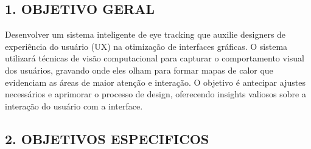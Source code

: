 \subsection*{1. OBJETIVO GERAL}
Desenvolver um sistema inteligente de eye tracking que auxilie designers de experiência do usuário (UX) na otimização de interfaces gráficas. O sistema utilizará técnicas de visão computacional para capturar o comportamento visual dos usuários, gravando onde eles olham para formar mapas de calor que evidenciam as áreas de maior atenção e interação. O objetivo é antecipar ajustes necessários e aprimorar o processo de design, oferecendo insights valiosos sobre a interação do usuário com a interface.

\subsection*{2. OBJETIVOS ESPECIFICOS}
